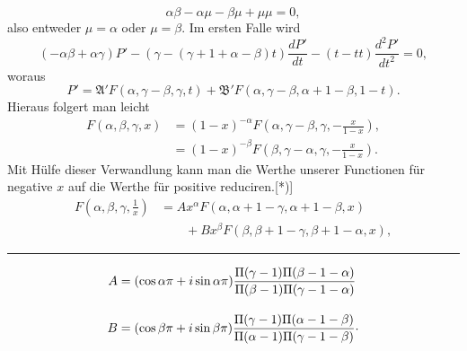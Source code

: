 \[\alpha\beta-\alpha\mu-\beta\mu+\mu\mu=0,\]
\noindent also entweder $\mu=\alpha$ oder $\mu=\beta$. Im ersten Falle wird
\[(-\alpha\beta+\alpha\gamma)P'-(\gamma-(\gamma+1+\alpha-\beta)t)\frac{dP'}{dt}-(t-tt)\frac{d^2P'}{dt^2}=0,\]
\noindent woraus
\[P'=\mathfrak{A}'F(\alpha,\gamma-\beta,\gamma,t)+\mathfrak{B}'F(\alpha,\gamma-\beta,\alpha+1-\beta,1-t).\]
\noindent Hieraus folgert man leicht
\[\begin{aligned}
F(\alpha,\beta,\gamma,x)&=(1-x)^{-\alpha}F\left(\alpha,\gamma-\beta,\gamma,-\frac{x}{1-x}\right),\\[.7em]
&=(1-x)^{-\beta}F\left(\beta,\gamma-\alpha,\gamma,-\frac{x}{1-x}\right).
\end{aligned}\]
\noindent Mit Hülfe dieser Verwandlung kann man die Werthe unserer Functionen für negative $x$ auf die Werthe für positive reduciren.[*)]
\[\begin{aligned}
F\left(\alpha,\beta,\gamma,\frac1x\right)&=Ax^\alpha F(\alpha,\alpha+1-\gamma,\alpha+1-\beta,x)\\[.7em]
&\qquad+Bx^\beta F(\beta,\beta+1-\gamma,\beta+1-\alpha,x),
\end{aligned}\]
\par\medskip\noindent\rule{.25\linewidth}{.4pt}\par\smallskip
{\small{}}
\clearpage{}
\[\begin{aligned}
A&=(\cos\alpha\pi+i\sin\alpha\pi)\frac{\Pi(\gamma-1)\Pi(\beta-1-\alpha)}{\Pi(\beta-1)\Pi(\gamma-1-\alpha)}\\[1em]
B&=(\cos\beta\pi+i\sin\beta\pi)\frac{\Pi(\gamma-1)\Pi(\alpha-1-\beta)}{\Pi(\alpha-1)\Pi(\gamma-1-\beta)}\mathpunct{\raisebox{.35ex}{.}}
\end{aligned}\]
\clearpage
\endgroup
